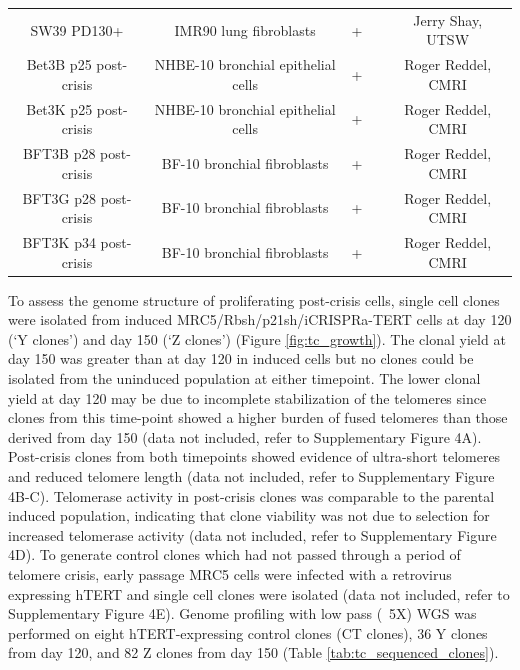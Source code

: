 \documentclass[phd,tocprelim]{cornell}
\begin{document}
\begin{table}[]
{\begin{tabular}{ccccc}
            SW39 PD130+           & IMR90 lung   fibroblasts             & +  & \cite{Shay1989-ua} & Jerry Shay, UTSW         \\
            Bet3B p25 post-crisis & NHBE-10 bronchial   epithelial cells & + & \cite{Bryan1995-ik}      & Roger Reddel, CMRI       \\
            Bet3K p25 post-crisis & NHBE-10 bronchial   epithelial cells & + & \cite{Bryan1995-ik}      & Roger Reddel, CMRI       \\
            BFT3B p28 post-crisis & BF-10 bronchial   fibroblasts        & + & \cite{Bryan1995-ik}      & Roger Reddel, CMRI       \\
            BFT3G p28 post-crisis & BF-10 bronchial   fibroblasts        & + & \cite{Bryan1995-ik}      & Roger Reddel, CMRI       \\
            BFT3K p34 post-crisis & BF-10 bronchial   fibroblasts        & + & \cite{Bryan1995-ik}      & Roger Reddel, CMRI       \\ \hline
        \end{tabular}
    }
\end{table}

To assess the genome structure of proliferating post-crisis cells, single cell clones were isolated from induced MRC5/Rbsh/p21sh/iCRISPRa-TERT cells at day 120 (‘Y clones’) and day 150 (‘Z clones’) (Figure \ref{fig:tc_growth}). The clonal yield at day 150 was greater than at day 120 in induced cells but no clones could be isolated from the uninduced population at either timepoint. The lower clonal yield at day 120 may be due to incomplete stabilization of the telomeres since clones from this time-point showed a higher burden of fused telomeres than those derived from day 150 (data not included, refer to \cite{Dewhurst2021-jk} Supplementary Figure 4A). Post-crisis clones from both timepoints showed evidence of ultra-short telomeres and reduced telomere length (data not included, refer to \cite{Dewhurst2021-jk} Supplementary Figure 4B-C). Telomerase activity in post-crisis clones was comparable to the parental induced population, indicating that clone viability was not due to selection for increased telomerase activity (data not included, refer to \cite{Dewhurst2021-jk} Supplementary Figure 4D). To generate control clones which had not passed through a period of telomere crisis, early passage MRC5 cells were infected with a retrovirus expressing hTERT and single cell clones were isolated (data not included, refer to \cite{Dewhurst2021-jk} Supplementary Figure 4E). Genome profiling with low pass (~5X) WGS was performed on eight hTERT-expressing control clones (CT clones), 36 Y clones from day 120, and 82 Z clones from day 150 (Table \ref{tab:tc_sequenced_clones}).
\end{document}
